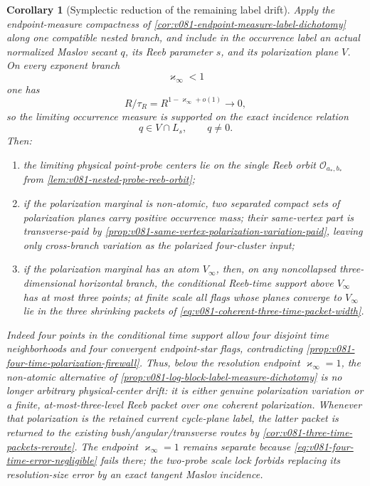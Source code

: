 \documentclass[10pt]{article}
\newtheorem{corollary}[theorem]{Corollary}
\begin{document}
\begin{corollary}[Symplectic reduction of the remaining label drift]
\label{cor:v081-nested-label-symplectic-reduction}
Apply the endpoint-measure compactness of
\cref{cor:v081-endpoint-measure-label-dichotomy} along one compatible nested branch, and include in
the occurrence label an actual normalized Maslov secant \(q\), its Reeb parameter \(s\), and its
polarization plane \(V\).  On every exponent branch
\[
\varkappa_\infty<1
\]
one has
\[
R/\tau_R=R^{1-\varkappa_\infty+o(1)}\to0,
\]
so the limiting occurrence measure is supported on the exact incidence relation
\[
q\in V\cap L_s,
\qquad q\ne0.
\]
Then:
\begin{enumerate}[label=\textnormal{(\roman*)}]
\item the limiting physical point-probe centers lie on the single Reeb orbit
\(\mathcal O_{a_*,b_*}\) from
\cref{lem:v081-nested-probe-reeb-orbit};
\item if the polarization marginal is non-atomic, two separated compact sets of polarization
planes carry positive occurrence mass; their same-vertex part is transverse-paid by
\cref{prop:v081-same-vertex-polarization-variation-paid}, leaving only cross-branch variation as
the polarized four-cluster input;
\item if the polarization marginal has an atom \(V_\infty\), then, on any noncollapsed
three-dimensional horizontal branch, the conditional Reeb-time support above \(V_\infty\) has at
most three points; at finite scale all flags whose planes converge to \(V_\infty\) lie in the
three shrinking packets of
\eqref{eq:v081-coherent-three-time-packet-width}.
\end{enumerate}
Indeed four points in the conditional time support allow four disjoint time neighborhoods and
four convergent endpoint-star flags, contradicting
\cref{prop:v081-four-time-polarization-firewall}.  Thus, below the resolution endpoint
\(\varkappa_\infty=1\), the non-atomic alternative of
\cref{prop:v081-log-block-label-measure-dichotomy} is no longer arbitrary physical-center drift:
it is either genuine polarization variation or a finite, at-most-three-level Reeb packet over one
coherent polarization.  Whenever that polarization is the retained current cycle-plane label, the
latter packet is returned to the existing bush/angular/transverse routes by
\cref{cor:v081-three-time-packets-reroute}.  The endpoint \(\varkappa_\infty=1\) remains separate because
\eqref{eq:v081-four-time-error-negligible} fails there; the two-probe scale lock forbids replacing
its resolution-size error by an exact tangent Maslov incidence.
\end{corollary}
\end{document}
